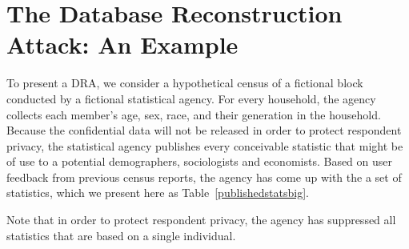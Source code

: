 \documentclass[runningheads]{llncs}
\begin{document}
\section{The Database Reconstruction Attack: An Example}

To present a DRA, we consider a hypothetical
census of a fictional block conducted by a fictional statistical
agency. For every household, the agency collects each member's age,
sex, race, and their generation in the household.  Because the
confidential data will not be released in order to protect respondent privacy, the statistical agency 
publishes every conceivable statistic that might be of use to a
potential demographers, sociologists and economists. Based on user
feedback from previous census reports, the agency has come up with the
a set of statistics, which we present here as Table~\ref{publishedstatsbig}.

Note that in order to protect respondent privacy, the agency has
suppressed all statistics that are based on a single
individual. 
\end{document}
